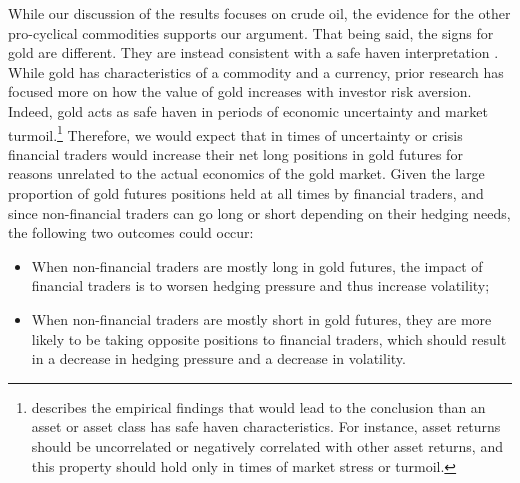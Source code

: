 \documentclass[12pt]{article}
\begin{document}
While our discussion of the results focuses on crude oil, the evidence for the other pro-cyclical commodities supports our argument. That being said, the signs for gold are different. They are instead consistent with a safe haven interpretation \citep{wu2019does}. While gold has characteristics of a commodity and a currency, prior research has focused more on how the value of gold increases with investor risk aversion. Indeed, gold acts as safe haven in periods of economic uncertainty and market turmoil.\footnote{ \citet{baur2010gold} describes the empirical findings that would lead to the conclusion than an asset or asset class has safe haven characteristics. For instance, asset returns should be uncorrelated or negatively correlated with other asset returns, and this property should hold only in times of market stress or turmoil.}
Therefore, we would expect that in times of uncertainty or crisis financial traders would increase their net long positions in gold futures for reasons unrelated to the actual economics of the gold market. Given the large proportion of gold futures positions held at all times by financial traders, and since non-financial traders can go long or short depending on their hedging needs, the following two outcomes could occur:

\begin{itemize}
\item When non-financial traders are mostly long in  gold futures, the impact of financial traders is to worsen  hedging pressure  and thus increase volatility;
\item When non-financial traders are mostly short in gold futures, they are more likely to be taking opposite positions to financial traders, which should result in a decrease in hedging pressure and a decrease in volatility.
\end{itemize}
\end{document}
